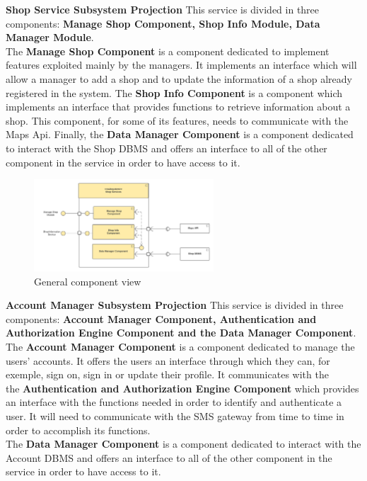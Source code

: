 \textbf{Shop Service Subsystem Projection}
This service is divided in three components: \textbf{Manage Shop Component, Shop Info Module, Data Manager Module}. \\
The \textbf{Manage Shop Component} is a component dedicated to implement features exploited mainly by the managers. It implements an interface which will allow a manager to add a shop and to update the information of a shop already registered in the system.
The \textbf{Shop Info Component} is a component which implements an interface that provides functions to retrieve information about a shop. This component, for some of its features, needs to communicate with the Maps Api.
Finally, the \textbf{Data Manager Component} is a component dedicated to interact with the Shop DBMS and offers an interface to all of the other component in the service in order to have access to it.

\begin{figure}[h!]
    \centering
    \includegraphics[width=0.6\textwidth]{Images/ComponentViewShopServices (1).png}
    \caption{\label{fig:ComponentViewShopServices}{General component view}}
\end{figure}

\textbf{Account Manager Subsystem Projection}
This service is divided in three components: \textbf{Account Manager Component, Authentication and Authorization Engine Component and the Data Manager Component}. \\
The \textbf{Account Manager Component} is a component dedicated to manage the users' accounts. It offers the users an interface through which they can, for exemple, sign on, sign in or update their profile. It communicates with the\\
the \textbf{Authentication and Authorization Engine Component} which provides an interface with the functions needed in order to identify and authenticate a user. It will need to communicate with the SMS gateway from time to time in order to accomplish its functions.\\
The \textbf{Data Manager Component} is a component dedicated to interact with the Account DBMS and offers an interface to all of the other component in the service in order to have access to it. 

